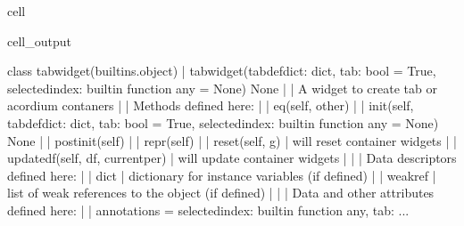\documentclass[letterpaper,10pt,english]{jupyterBook}
\begin{document}
\begin{sphinxuseclass}{cell}
\begin{sphinxVerbatimOutput}
\begin{sphinxuseclass}{cell_output}
\begin{sphinxVerbatim}[commandchars=\\\{\}]
    class tabwidget(builtins.object)
     |  tabwidget(tabdefdict: dict, tab: bool = True, selected\PYGZus{}index: \PYGZlt{}built\PYGZhy{}in function any\PYGZgt{} = None) \PYGZhy{}\PYGZgt{} None
     |  
     |  A widget to create tab or acordium contaners
     |  
     |  Methods defined here:
     |  
     |  \PYGZus{}\PYGZus{}eq\PYGZus{}\PYGZus{}(self, other)
     |  
     |  \PYGZus{}\PYGZus{}init\PYGZus{}\PYGZus{}(self, tabdefdict: dict, tab: bool = True, selected\PYGZus{}index: \PYGZlt{}built\PYGZhy{}in function any\PYGZgt{} = None) \PYGZhy{}\PYGZgt{} None
     |  
     |  \PYGZus{}\PYGZus{}post\PYGZus{}init\PYGZus{}\PYGZus{}(self)
     |  
     |  \PYGZus{}\PYGZus{}repr\PYGZus{}\PYGZus{}(self)
     |  
     |  reset(self, g)
     |      will reset  container widgets
     |  
     |  update\PYGZus{}df(self, df, current\PYGZus{}per)
     |      will update container widgets
     |  
     |  \PYGZhy{}\PYGZhy{}\PYGZhy{}\PYGZhy{}\PYGZhy{}\PYGZhy{}\PYGZhy{}\PYGZhy{}\PYGZhy{}\PYGZhy{}\PYGZhy{}\PYGZhy{}\PYGZhy{}\PYGZhy{}\PYGZhy{}\PYGZhy{}\PYGZhy{}\PYGZhy{}\PYGZhy{}\PYGZhy{}\PYGZhy{}\PYGZhy{}\PYGZhy{}\PYGZhy{}\PYGZhy{}\PYGZhy{}\PYGZhy{}\PYGZhy{}\PYGZhy{}\PYGZhy{}\PYGZhy{}\PYGZhy{}\PYGZhy{}\PYGZhy{}\PYGZhy{}\PYGZhy{}\PYGZhy{}\PYGZhy{}\PYGZhy{}\PYGZhy{}\PYGZhy{}\PYGZhy{}\PYGZhy{}\PYGZhy{}\PYGZhy{}\PYGZhy{}\PYGZhy{}\PYGZhy{}\PYGZhy{}\PYGZhy{}\PYGZhy{}\PYGZhy{}\PYGZhy{}\PYGZhy{}\PYGZhy{}\PYGZhy{}\PYGZhy{}\PYGZhy{}\PYGZhy{}\PYGZhy{}\PYGZhy{}\PYGZhy{}\PYGZhy{}\PYGZhy{}\PYGZhy{}\PYGZhy{}\PYGZhy{}\PYGZhy{}\PYGZhy{}\PYGZhy{}
     |  Data descriptors defined here:
     |  
     |  \PYGZus{}\PYGZus{}dict\PYGZus{}\PYGZus{}
     |      dictionary for instance variables (if defined)
     |  
     |  \PYGZus{}\PYGZus{}weakref\PYGZus{}\PYGZus{}
     |      list of weak references to the object (if defined)
     |  
     |  \PYGZhy{}\PYGZhy{}\PYGZhy{}\PYGZhy{}\PYGZhy{}\PYGZhy{}\PYGZhy{}\PYGZhy{}\PYGZhy{}\PYGZhy{}\PYGZhy{}\PYGZhy{}\PYGZhy{}\PYGZhy{}\PYGZhy{}\PYGZhy{}\PYGZhy{}\PYGZhy{}\PYGZhy{}\PYGZhy{}\PYGZhy{}\PYGZhy{}\PYGZhy{}\PYGZhy{}\PYGZhy{}\PYGZhy{}\PYGZhy{}\PYGZhy{}\PYGZhy{}\PYGZhy{}\PYGZhy{}\PYGZhy{}\PYGZhy{}\PYGZhy{}\PYGZhy{}\PYGZhy{}\PYGZhy{}\PYGZhy{}\PYGZhy{}\PYGZhy{}\PYGZhy{}\PYGZhy{}\PYGZhy{}\PYGZhy{}\PYGZhy{}\PYGZhy{}\PYGZhy{}\PYGZhy{}\PYGZhy{}\PYGZhy{}\PYGZhy{}\PYGZhy{}\PYGZhy{}\PYGZhy{}\PYGZhy{}\PYGZhy{}\PYGZhy{}\PYGZhy{}\PYGZhy{}\PYGZhy{}\PYGZhy{}\PYGZhy{}\PYGZhy{}\PYGZhy{}\PYGZhy{}\PYGZhy{}\PYGZhy{}\PYGZhy{}\PYGZhy{}\PYGZhy{}
     |  Data and other attributes defined here:
     |  
     |  \PYGZus{}\PYGZus{}annotations\PYGZus{}\PYGZus{} = \PYGZob{}\PYGZsq{}selected\PYGZus{}index\PYGZsq{}: \PYGZlt{}built\PYGZhy{}in function any\PYGZgt{}, \PYGZsq{}tab\PYGZsq{}: \PYGZlt{}...

\end{sphinxVerbatim}
\end{sphinxuseclass}
\end{sphinxVerbatimOutput}
\end{sphinxuseclass}
\end{document}
